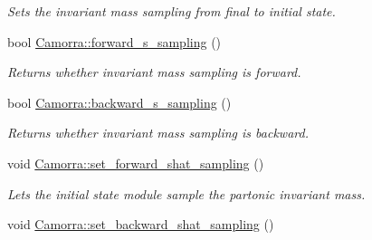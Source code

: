 \begin{DoxyCompactItemize}
\begin{DoxyCompactList}\small\item\em Sets the invariant mass sampling from final to initial state. \end{DoxyCompactList}\item 
\hypertarget{a00829_a338ee68efb1f21066746b1371f7e55b8}{
bool \hyperlink{a00829_a338ee68efb1f21066746b1371f7e55b8}{Camorra::forward\_\-s\_\-sampling} ()}
\label{a00829_a338ee68efb1f21066746b1371f7e55b8}

\begin{DoxyCompactList}\small\item\em Returns whether invariant mass sampling is forward. \end{DoxyCompactList}\item 
\hypertarget{a00829_a10d06d9eeb886cc2282993cf798acd48}{
bool \hyperlink{a00829_a10d06d9eeb886cc2282993cf798acd48}{Camorra::backward\_\-s\_\-sampling} ()}
\label{a00829_a10d06d9eeb886cc2282993cf798acd48}

\begin{DoxyCompactList}\small\item\em Returns whether invariant mass sampling is backward. \end{DoxyCompactList}\item 
\hypertarget{a00829_af3c92b5bd28219c042733f3c86a6fa2d}{
void \hyperlink{a00829_af3c92b5bd28219c042733f3c86a6fa2d}{Camorra::set\_\-forward\_\-shat\_\-sampling} ()}
\label{a00829_af3c92b5bd28219c042733f3c86a6fa2d}

\begin{DoxyCompactList}\small\item\em Lets the initial state module sample the partonic invariant mass. \end{DoxyCompactList}\item 
\hypertarget{a00829_a65b84100ed1fb9d859af1f98128e0e4c}{
void \hyperlink{a00829_a65b84100ed1fb9d859af1f98128e0e4c}{Camorra::set\_\-backward\_\-shat\_\-sampling} ()}
\label{a00829_a65b84100ed1fb9d859af1f98128e0e4c}


\end{DoxyCompactItemize}
